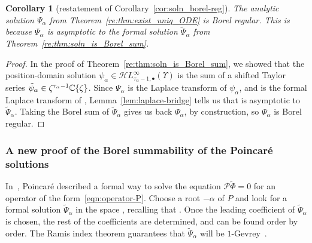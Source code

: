 \documentclass[pdftex]{sigma}
\newcommand{\singexp}[2]{\mathcal{H}L^\infty_{#1, #2}}
\newcommand{\singexpalg}[1]{\singexp{#1}{\bullet}}
\newcommand{\C}{\mathbb{C}}
\newcommand{\series}[1]{\tilde{#1}}
\numberwithin{equation}{section}
\newtheorem{Corollary}[Theorem]{Corollary}
\begin{document}
\begin{Corollary}[restatement of Corollary~\ref{cor:soln_borel-reg}]\label{re:cor:soln_borel-reg}
The analytic solution $\Psi_\alpha$ from Theorem~{\rm\ref{re:thm:exist_uniq_ODE}} is Borel regular. This is because $\Psi_\alpha$ is asymptotic to the formal solution $\series{\Psi}_\alpha$ from Theorem~{\rm\ref{re:thm:soln_is_Borel_sum}}.
\end{Corollary}
\begin{proof}
In the proof of Theorem~\ref{re:thm:soln_is_Borel_sum}, we showed that the position-domain solution $\psi_\alpha \in \singexpalg{\tau_\alpha-1}(\Upsilon)$ is the sum of a shifted Taylor series $\series{\psi}_\alpha \in\smash{ \zeta^{\tau_\alpha-1} \C\{\zeta\}}$. Since $\Psi_\alpha$ is the Laplace transform of $\psi_\alpha$, and \smash{$\series{\Psi}_\alpha$} is the formal Laplace transform of \smash{$\series{\psi}_\alpha$}, Lemma~\ref{lem:laplace-bridge} tells us that \smash{$\Psi_\alpha$} is asymptotic to $\series{\Psi}_\alpha$. Taking the Borel sum of $\series{\Psi}_\alpha$ gives us back $\Psi_\alpha$, by construction, so $\Psi_\alpha$ is Borel regular.
\end{proof}

\subsubsection{A new proof of the Borel summability of the Poincar\'e solutions}\label{sec:new-summability-proof}
In~\cite{int-irreg}, Poincar\'e described a formal way to solve the equation $\mathcal{P}\series{\Phi} = 0$ for an operator of the form~\eqref{eqn:operator-P}. Choose a root $-\alpha$ of $P$ and look for a formal solution $\series{\Psi}_\alpha$ in the space \smash{${\rm e}^{-z\alpha} z^{-\tau_\alpha}\C\big\llbracket z^{-1} \big\rrbracket$}, recalling that . Once the leading coefficient of $\series{\Psi}_\alpha$ is chosen, the rest of the coefficients are determined, and can be found order by order. The Ramis index theorem guarantees that $\series{\Psi}_\alpha$ will be $1$-Gevrey~\cite{ramis_index}.
\end{document}
